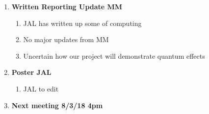 \begin{enumerate}
\begin{enumerate}
\end{enumerate}

\item  \textbf{Written Reporting Update MM}

\begin{enumerate}
\item JAL has written up some of computing

\item  No major updates from MM

\item  Uncertain how our project will demonstrate quantum effects
\vspace{5mm}
\end{enumerate}

\item  \textbf{Poster JAL}

\begin{enumerate}
\item JAL to edit
\vspace{5mm}
\end{enumerate}

\item  \textbf{Next meeting 8/3/18 4pm}
\end{enumerate}

